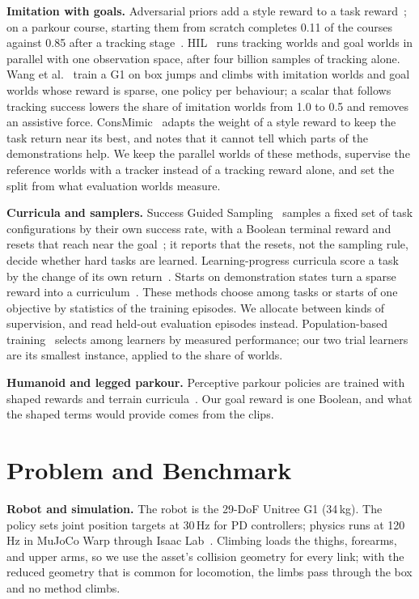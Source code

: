 \textbf{Imitation with goals.} Adversarial priors add a style reward to a task reward~\cite{amp,amphardware}; on a parkour course, starting them from scratch completes 0.11 of the courses against 0.85 after a tracking stage~\cite{hil}. HIL~\cite{hil} runs tracking worlds and goal worlds in parallel with one observation space, after four billion samples of tracking alone. Wang et al.~\cite{wang2026generalizing} train a G1 on box jumps and climbs with imitation worlds and goal worlds whose reward is sparse, one policy per behaviour; a scalar that follows tracking success lowers the share of imitation worlds from 1.0 to 0.5 and removes an assistive force. ConsMimic~\cite{consmimic} adapts the weight of a style reward to keep the task return near its best, and notes that it cannot tell which parts of the demonstrations help. We keep the parallel worlds of these methods, supervise the reference worlds with a tracker instead of a tracking reward alone, and set the split from what evaluation worlds measure.

\textbf{Curricula and samplers.} Success Guided Sampling~\cite{sgs} samples a fixed set of task configurations by their own success rate, with a Boolean terminal reward and resets that reach near the goal~\cite{omnireset}; it reports that the resets, not the sampling rule, decide whether hard tasks are learned. Learning-progress curricula score a task by the change of its own return~\cite{lpacrl,graves2017automated}. Starts on demonstration states turn a sparse reward into a curriculum~\cite{florensa2017reverse,demostart,scout,goexplore}. These methods choose among tasks or starts of one objective by statistics of the training episodes. We allocate between kinds of supervision, and read held-out evaluation episodes instead. Population-based training~\cite{pbt} selects among learners by measured performance; our two trial learners are its smallest instance, applied to the share of worlds.

\textbf{Humanoid and legged parkour.} Perceptive parkour policies are trained with shaped rewards and terrain curricula~\cite{zhuang2023robot,cheng2024extreme,hoeller2024anymal,zhuang2024humanoid}. Our goal reward is one Boolean, and what the shaped terms would provide comes from the clips.

\section{Problem and Benchmark}
\label{sec:benchmark}

\textbf{Robot and simulation.} The robot is the 29-DoF Unitree G1 (34\,kg). The policy sets joint position targets at 30\,Hz for PD controllers; physics runs at 120\,Hz in MuJoCo Warp through Isaac Lab~\cite{isaaclab}. Climbing loads the thighs, forearms, and upper arms, so we use the asset's collision geometry for every link; with the reduced geometry that is common for locomotion, the limbs pass through the box and no method climbs.

